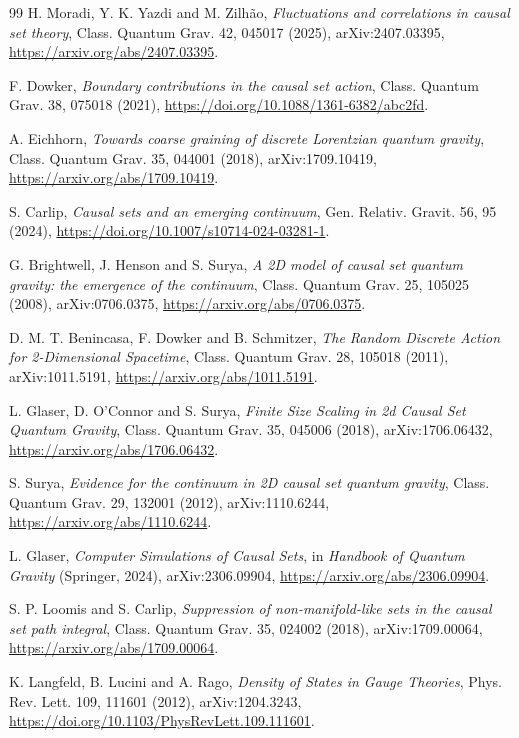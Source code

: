 \documentclass[11pt,a4paper]{article}
\begin{document}
\begin{thebibliography}{99}
H. Moradi, Y. K. Yazdi and M. Zilh\~ao,
\textit{Fluctuations and correlations in causal set theory},
Class. Quantum Grav. 42, 045017 (2025),
arXiv:2407.03395,
\url{https://arxiv.org/abs/2407.03395}.

F. Dowker,
\textit{Boundary contributions in the causal set action},
Class. Quantum Grav. 38, 075018 (2021),
\url{https://doi.org/10.1088/1361-6382/abc2fd}.

A. Eichhorn,
\textit{Towards coarse graining of discrete Lorentzian quantum gravity},
Class. Quantum Grav. 35, 044001 (2018),
arXiv:1709.10419,
\url{https://arxiv.org/abs/1709.10419}.

S. Carlip,
\textit{Causal sets and an emerging continuum},
Gen. Relativ. Gravit. 56, 95 (2024),
\url{https://doi.org/10.1007/s10714-024-03281-1}.


G. Brightwell, J. Henson and S. Surya,
\textit{A 2D model of causal set quantum gravity: the emergence of the continuum},
Class. Quantum Grav. 25, 105025 (2008),
arXiv:0706.0375,
\url{https://arxiv.org/abs/0706.0375}.

D. M. T. Benincasa, F. Dowker and B. Schmitzer,
\textit{The Random Discrete Action for 2-Dimensional Spacetime},
Class. Quantum Grav. 28, 105018 (2011),
arXiv:1011.5191,
\url{https://arxiv.org/abs/1011.5191}.

L. Glaser, D. O'Connor and S. Surya,
\textit{Finite Size Scaling in 2d Causal Set Quantum Gravity},
Class. Quantum Grav. 35, 045006 (2018),
arXiv:1706.06432,
\url{https://arxiv.org/abs/1706.06432}.

S. Surya,
\textit{Evidence for the continuum in 2D causal set quantum gravity},
Class. Quantum Grav. 29, 132001 (2012),
arXiv:1110.6244,
\url{https://arxiv.org/abs/1110.6244}.

L. Glaser,
\textit{Computer Simulations of Causal Sets},
in \textit{Handbook of Quantum Gravity} (Springer, 2024),
arXiv:2306.09904,
\url{https://arxiv.org/abs/2306.09904}.

S. P. Loomis and S. Carlip,
\textit{Suppression of non-manifold-like sets in the causal set path integral},
Class. Quantum Grav. 35, 024002 (2018),
arXiv:1709.00064,
\url{https://arxiv.org/abs/1709.00064}.

K. Langfeld, B. Lucini and A. Rago,
\textit{Density of States in Gauge Theories},
Phys. Rev. Lett. 109, 111601 (2012),
arXiv:1204.3243,
\url{https://doi.org/10.1103/PhysRevLett.109.111601}.


\end{thebibliography}
\end{document}
